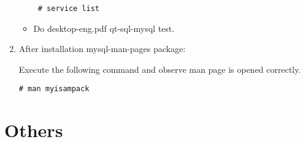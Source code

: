 \documentclass[a4paper,10pt]{article}
\begin{document}
\begin{enumerate}
\begin{itemize}
\begin{verbatim}
 # service list
\end{verbatim}
 \item Do desktop-eng.pdf qt-sql-mysql test.

\end{itemize}

\item After installation mysql-man-pages package:

Execute the following command and observe man page is opened correctly.
\begin{verbatim}
# man myisampack 
\end{verbatim}

\end{enumerate}

\section{Others}
\end{document}
